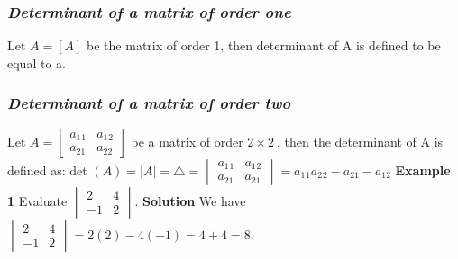 \documentclass{article}
\begin{document}
\subsubsection{\textit{Determinant of a matrix of order one}}
Let \begin{math}
    A=[A]
    \end{math}
be the matrix of order 1, then determinant of A is defined to be equal to a.
    
\subsubsection{\textit{Determinant of a matrix of order two}}
Let 
\begin{math}A=
\begin{bmatrix}a_1{}_1 & a_1{}_2\\
a_{21} & a_{22}
\end{bmatrix}
\end{math} be a matrix of order 
\begin{math}
2\times2\    
\end{math},
\newline
\newline
then the determinant of A is defined as:
\newline
\newline
det 
\begin{math}(A)=|A|=\triangle=
\begin{vmatrix}
a_1{}_1 & a_1{}_2
\\
a_{21} & a_{21}
\end{vmatrix}
=a_1{}_1a_2{}_2-a_{21}-a_{12}
\end{math}
\newline
\newline
\textbf{Example 1}
Evaluate
\begin{math}
\begin{vmatrix}
2 & 4\\
-1 & 2
\end{vmatrix}.
\end{math}
\newline
\newline
\textbf{Solution} We have
\begin{math}
\begin{vmatrix}
2 & 4\\
-1 & 2
\end{vmatrix}
=2(2)-4(-1)=4+4=8.
\end{math}
\newline
\newline
\end{document}
